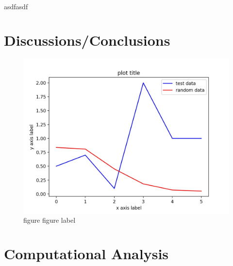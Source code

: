 \documentclass[11pt,twocolumn]{article}
\begin{document}
asdfasdf

\section{Discussions/Conclusions}
\lipsum[1-3]


\begin{figure}[htb]
    \centering 
    \includegraphics[width=\linewidth]{samplefig.jpg}
    \caption{\label{fig:galaxy}figure figure label}
\end{figure}

\lipsum[4-5]

\section{Computational Analysis}
\lipsum[4-4]



\lipsum[4-7]
\end{document}
